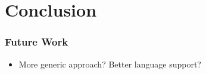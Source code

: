 
\chapter{Conclusion}\label{chapter:conclusion}
\subsection{Future Work}
\begin{itemize}
    \item More generic approach? Better language support?
\end{itemize}

